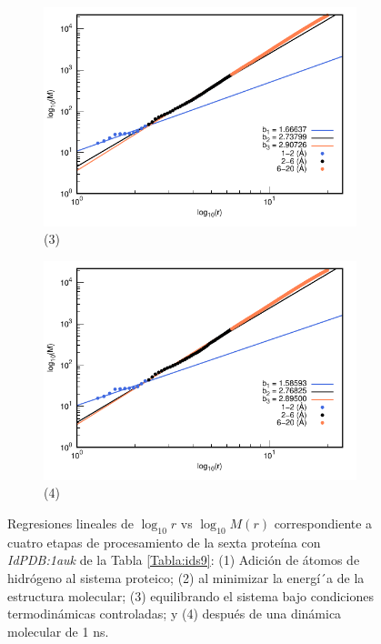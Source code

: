 \begin{figure}[H]
	\vspace{0cm} %
	
	\hspace{-0.3cm} 
	\begin{subfigure}{0.49\textwidth}
		\centering
		\includegraphics[width=\linewidth,page=1]{graphs/PDBs/1auk/1aukEq.pdf}
		\caption{(3)}
	\end{subfigure}
	\hspace{0.2cm}
	\begin{subfigure}{0.49\textwidth} %
		\centering
		\includegraphics[width=\linewidth,page=1]{graphs/PDBs/1auk/1auk1ns.pdf}
		\caption{(4)}
	\end{subfigure}
	\caption{Regresiones lineales de $\log_{10}r$ vs $\log_{10}M(r)$ correspondiente a cuatro etapas de procesamiento de la sexta prote\'{i}na con \textit{IdPDB:1auk} de la Tabla \ref{Tabla:ids9}: (1) Adici\'{o}n de \'{a}tomos de hidr\'{o}geno al sistema proteico; (2) al minimizar la energ\'{i´}a de la estructura molecular; (3) equilibrando el sistema bajo condiciones termodin\'{a}micas controladas; y (4) despu\'{e}s de una din\'{a}mica molecular de 1 ns.}
	\label{fig:1auk}
\end{figure}

